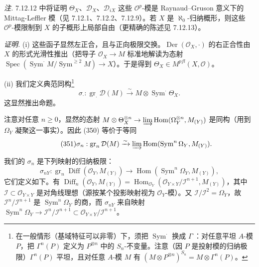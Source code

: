 \emph{注.} 7.12.12 中将证明 $\Theta_X$、$\mathcal{D}_X$、$\mathcal{D}_{iX}$ 这些 $\mathcal{O}^p$-模是 Raynaud--Gruson 意义下的 Mittag-Leffler 模（见 7.12.1、7.12.2、7.12.9）。若 $X$ 是 $\aleph_0$-归纳概形，则这些 $\mathcal{O}^p$-模限制到 $X$ 的子概形上局部自由（更精确的陈述见 7.12.13）。

\emph{证明.} (i) 这些函子显然左正合，且与正向极限交换。$\operatorname{Der}(\mathcal{O}_X,\cdot)$ 的右正合性由 $X$ 的形式光滑性推出（把导子 $\mathcal{O}_X\to M$ 标准地解读为态射 $\operatorname{Spec}(\operatorname{Sym}^\cdot M/\operatorname{Sym}^{\ge 2}M)\to X$）。于是得到 $\Theta_X\in M^{pfl}(X,\mathcal{O})$。

(ii) 我们定义典范同构\footnote{在一般情形（基域特征可以非零）下，须把 $\operatorname{Sym}^\cdot$ 换成 $\Gamma^\cdot$：对任意平坦 $A$-模 $P$，把 $\Gamma^n(P)$ 定义为 $P^{\otimes n}$ 中的 $S_n$-不变量。注意（因 $P$ 是投射模的归纳极限）$\Gamma^n(P)$ 平坦，且对任意 $A$-模 $M$ 有 $(M\otimes P^{\otimes n})^{S_n}=M\otimes\Gamma^n(P)$。}
\begin{equation}\tag{350}
\sigma_\cdot:\operatorname{gr}_\cdot\mathcal{D}(M)\xrightarrow{\sim}M\otimes\operatorname{Sym}^\cdot\Theta_X.
\end{equation}
这显然推出命题。

注意对任意 $n\ge 0$，显然的态射 $M\otimes\Theta_X^{\otimes n}\to\varinjlim\operatorname{Hom}(\Omega_Y^{\otimes n},M_{(Y)})$ 是同构（用到 $\Omega_Y$ 凝聚这一事实）。因此 (350) 等价于等同
\begin{equation}\tag{351}
\sigma_n:\operatorname{gr}_n\mathcal{D}(M)\xrightarrow{\sim}\varinjlim\operatorname{Hom}(\operatorname{Sym}^n\Omega_Y,M_{(Y)}).
\end{equation}


我们的 $\sigma_n$ 是下列映射的归纳极限：
\[
\sigma_{nY}:\operatorname{gr}_n\operatorname{Diff}(\mathcal{O}_Y,M_{(Y)})\to\operatorname{Hom}(\operatorname{Sym}^n\Omega_Y,M_{(Y)}),
\]
它们定义如下。有 $\operatorname{Diff}_n(\mathcal{O}_Y,M_{(Y)})=\operatorname{Hom}_{\mathcal{O}_Y}(\mathcal{O}_{Y\times Y}/\mathcal{I}^{n+1},M_{(Y)})$，其中 $\mathcal{I}\subset\mathcal{O}_{Y\times Y}$ 是对角线理想（源按某个投影映射视为 $\mathcal{O}_Y$-模）。又 $\mathcal{I}/\mathcal{I}^2=\Omega_Y$，故 $\mathcal{I}^n/\mathcal{I}^{n+1}$ 是 $\operatorname{Sym}^n\Omega_Y$ 的商，而 $\sigma_{nY}$ 来自映射 $\operatorname{Sym}^n\Omega_Y\to\mathcal{I}^n/\mathcal{I}^{n+1}\subset\mathcal{O}_{Y\times Y}/\mathcal{I}^{n+1}$。

